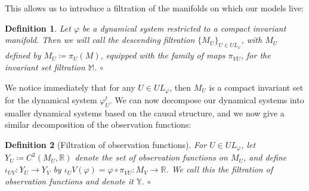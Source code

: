 \documentclass[11pt, a4paper]{memoir}
\theoremstyle{break}
\theoremstyle{break}
\newtheorem{innerdefn}{Definition}
\newenvironment{defn}
  {\begin{innerdefn}}
  {\ensuremath{\circ}\end{innerdefn}}
\theoremstyle{nonumberplain}
\newcommand{\mR}{\mathbb{R}}
\begin{document}
This allows us to introduce a filtration of the manifolds on which our models live:
\begin{defn}
Let $\varphi$ be a dynamical system restricted to a compact invariant manifold. Then we will call the descending filtration $\{M_U\}_{U\in UL_\varphi}$, with $M_U$ defined by $M_U\coloneqq \pi_U(M)$, equipped with the family of maps $\pi_{VU}$, for the \emph{invariant set filtration} $\mathbb{M}$.
\end{defn}
We notice immediately that for any $U\in UL_\varphi$, then $M_U$ is a compact invariant set for the dynamical system $\varphi^t_U$. We can now decompose our dynamical systems into smaller dynamical systems based on the causal structure, and we now give a similar decomposition of the observation functions:
\begin{defn}[Filtration of observation functions]
For $U\in UL_\varphi$, let $Y_U\coloneqq C^2(M_U,\mR)$ denote the set of observation functions on $M_U$, and define $\iota_{UV}:Y_U\to Y_V$ by $\iota_UV(\varphi)=\varphi\circ \pi_{VU}:M_V\to \mR$. We call this the \emph{filtration of observation functions} and denote it $\mathbb{Y}$.
\end{defn}
\end{document}
